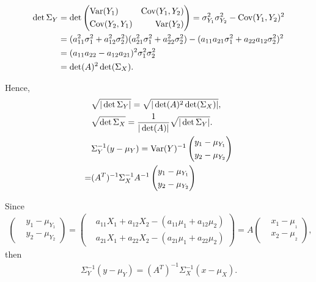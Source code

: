 {\begin{align*}
    \det\Sigma_{Y}&=\det\left(\begin{aligned}
        &\text{Var}(Y_1) & \text{Cov}(Y_1,Y_2)\\
        &\text{Cov}(Y_2,Y_1) & \text{Var}(Y_2)
    \end{aligned}\right)=\sigma_{Y_1}^2\sigma_{Y_2}^2-\text{Cov}(Y_1,Y_2)^2\\
    &=(a_{11}^2\sigma_1^2+a_{12}^2\sigma_2^2)(a_{21}^2\sigma_1^2+a_{22}^2\sigma_2^2)-(a_{11}a_{21}\sigma_1^2+a_{22}a_{12}\sigma_2^2)^2\\
    &=(a_{11}a_{22}-a_{12}a_{21})^2\sigma_1^2\sigma_2^2\\
    &=\det(A)^2\det(\Sigma_X).
\end{align*}

Hence,
\begin{align*}
    &\sqrt{|\det\Sigma_Y|}=\sqrt{|\det(A)^2\det(\Sigma_X)|},\\
    &\sqrt{\det\Sigma_X}=\frac{1}{|\det(A)|}\sqrt{|\det\Sigma_Y|}.\\
    &\Sigma_Y^{-1}(y-\mu_Y)=\text{Var}(Y)^{-1}
    \left(\begin{aligned}
        &y_1-\mu_{Y_1}\\
        &y_2-\mu_{Y_2}
    \end{aligned}\right)\\
    =&(A^{T})^{-1}\Sigma_X^{-1}A^{-1}\left(\begin{aligned}
        &y_1-\mu_{Y_1}\\
        &y_2-\mu_{Y_2}
    \end{aligned}\right)
\end{align*}

Since
\begin{align*}
    \left(\begin{aligned}
        &y_1-\mu_{Y_1}\\
        &y_2-\mu_{Y_2}
    \end{aligned}\right)=
    \left(\begin{aligned}
        &a_{11}X_1+a_{12}X_2-(a_{11}\mu_1+a_{12}\mu_2)\\
        &a_{21}X_1+a_{22}X_2-(a_{21}\mu_1+a_{22}\mu_2)
    \end{aligned}\right)=
    A\left(\begin{aligned}
        &x_1-\mu_{_1}\\
        &x_2-\mu_{_2}
    \end{aligned}\right),
\end{align*}
then
\begin{align*}
    \Sigma_Y^{-1}(y-\mu_Y)=(A^{T})^{-1}\Sigma_X^{-1}(x-\mu_X).
\end{align*}

}
